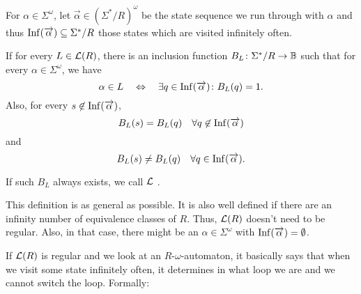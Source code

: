 \begin{mydef}
\label{gen:def:infinity-postfix-independent}
For $\alpha \in \Sigma^\omega$, let $\overrightarrow \alpha \in (\Sigma^* / R)^\omega$ be the state sequence we run through with $\alpha$ and thus $\operatorname{Inf}(\overrightarrow \alpha) \subseteq \Sigma^*/R$ those states which are visited infinitely often.

If for every $L \in \mathcal{L}(R)$, there is an inclusion function $B_L \colon \Sigma^*/R \rightarrow \mathbb{B}$ such that for every $\alpha \in \Sigma^\omega$, we have
\[ \alpha \in L \ \ \ \Leftrightarrow \ \ \ \exists q \in \operatorname{Inf}(\overrightarrow \alpha) \colon B_L(q) = 1 . \]
Also, for every $s \not\in \operatorname{Inf}(\overrightarrow \alpha)$,
\[ B_L(s) = B_L(q) \ \ \ \forall q \not\in \operatorname{Inf}(\overrightarrow \alpha) \]
and
\[ B_L(s) \neq B_L(q) \ \ \ \forall q \in \operatorname{Inf}(\overrightarrow \alpha) . \]

If such $B_L$ always exists, we call $\mathcal{L}$ .
\end{mydef}

This definition is as general as possible. It is also well defined if there are an infinity number of equivalence classes of $R$. Thus, $\mathcal{L}(R)$ doesn't need to be regular. Also, in that case, there might be an $\alpha \in \Sigma^\omega$ with $\operatorname{Inf}(\overrightarrow \alpha) = \emptyset$.

If $\mathcal{L}(R)$ is regular and we look at an $R$-$\omega$-automaton, it basically says that when we visit some state infinitely often, it determines in what loop we are and we cannot switch the loop. Formally:

